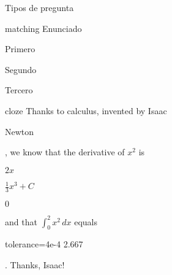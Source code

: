 \documentclass[a4,11pt]{aleph-notas}
\begin{document}
\begin{quiz}{Tipos de pregunta}
\begin{matching}[]%
    {matching} 
    Enunciado
    \item Primero 
    \item Segundo 
    \item Tercero 
\end{matching}

\begin{cloze}%
    {cloze} 
    Thanks to calculus, invented by Isaac 
    \begin{shortanswer}[usecase] 
        \item Newton 
    \end{shortanswer}, 
    we know that the derivative of $x^2$ is 
    \begin{multi}[] 
        \item $2x$ 
        \item* $\frac{1}{3} x^3 + C$ 
        \item $0$ 
    \end{multi}
    and that $\int_0^2 x^2\,dx$ equals 
    \begin{numerical} 
        \item[tolerance={4e-4}] 2.667 
    \end{numerical}. 
    Thanks, Isaac! 
\end{cloze}


\end{quiz}
\end{document}
